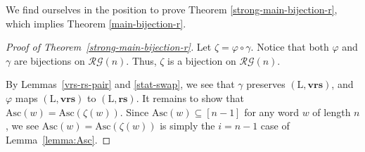 \documentclass[12pt]{amsart}
\numberwithin{equation}{section}
\theoremstyle{plain}
\theoremstyle{definition}
\def\wrs{\mathrm{vrs}}
\def\Asc{\mathrm{Asc}}
\def\LL{\mathrm{L}}
\def\brs{\mathbf{rs}}
\def\bwrs{\mathbf{vrs}}
\def\suf{\mathrm{suf}}
\def\RG{\mathcal{RG}}
\begin{document}
We find ourselves in the position to prove Theorem \ref{strong-main-bijection-r}, which implies Theorem \ref{main-bijection-r}.
\begin{proof}[Proof of Theorem~\ref{strong-main-bijection-r}]
Let $\zeta=\varphi  \circ  \gamma$. Notice that both $\varphi$ and $\gamma$ are bijections on $\RG(n)$. Thus, $\zeta$ is a bijection on
$\RG(n)$.

By Lemmas~\ref{vrs-rs-pair} and \ref{stat-swap}, we see that $\gamma$ preserves $(\LL,\bwrs)$, and $\varphi$ maps $(\LL, \bwrs)$ to $(\LL, \brs)$. It remains to show that $\Asc(w)=\Asc(\zeta(w))$. Since $\Asc(w)\subseteq [n-1]$ for any word $w$ of length $n$, we see $\Asc(w)=\Asc(\zeta(w))$ is simply the $i=n-1$ case of Lemma~\ref{lemma:Asc}.


\end{proof}

\end{document}
